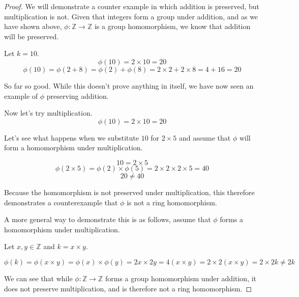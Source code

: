 \documentclass[a4paper]{article}
\begin{document}
\begin{myparindent}{0pt}
\begin{proof}
  We will demonstrate a counter example in which addition is preserved, but
  multiplication is not. Given that integers form a group under addition,
  and as we have shown above, $\phi: \mathbb{Z} \rightarrow \mathbb{Z}$ is a
  group homomorphism, we know that addition will be preserved. \newline

  Let $k = 10$.
  \[ \phi(10) = 2 \times 10 = 20 \]
  \[ \phi(10) = \phi(2 + 8) = \phi(2) + \phi(8) = 2 \times 2 + 2 \times 8 = 4 + 16 = 20 \]

  So far so good. While this doesn't prove anything in itself, we have now seen an
  example of $\phi$ preserving addition. \newline

  Now let's try multiplication.
  \[ \phi(10) = 2 \times 10 = 20 \]

  Let's see what happens when we substitute $10$ for $2 \times 5$ and assume that
  $\phi$ will form a homomorphism under multiplication.

  \[ 10 = 2 \times 5 \]
  \[ \phi(2 \times 5) = \phi(2) \times \phi(5) = 2 \times 2 \times 2 \times 5 = 40 \]
  \[ 20 \neq 40 \]

  Because the homomorphism is not preserved under multiplication, this therefore
  demonstrates a counterexample that $\phi$ is not a ring homomorphism.

  A more general way to demonstrate this is as follows, assume that $\phi$
  forms a homomorphism under multiplication. \newline

  Let $x, y \in \mathbb{Z}$ and $k = x \times y$.

  \[ \phi(k) = \phi(x \times y) = \phi(x) \times \phi(y) = 2x \times 2y = 4(x \times y) =
  2 \times 2(x \times y) = 2 \times 2k \neq 2k \]

  We can see that while $\phi: \mathbb{Z} \rightarrow \mathbb{Z}$ forms a group
  homomorphism under addition, it does not preserve multiplication, and is
  therefore not a ring homomorphism.

\end{proof}

\end{myparindent}
\end{document}
